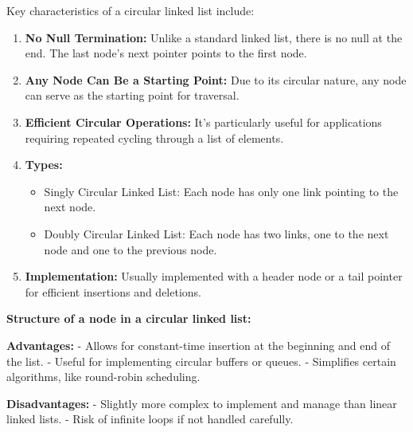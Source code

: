 Key characteristics of a circular linked list include:

\begin{enumerate}
\def\labelenumi{\arabic{enumi}.}
\item
  \textbf{No Null Termination:} Unlike a standard linked list, there is
  no null at the end. The last node's next pointer points to the first
  node.
\item
  \textbf{Any Node Can Be a Starting Point:} Due to its circular nature,
  any node can serve as the starting point for traversal.
\item
  \textbf{Efficient Circular Operations:} It's particularly useful for
  applications requiring repeated cycling through a list of elements.
\item
  \textbf{Types:}

  \begin{itemize}
  \tightlist
  \item
    Singly Circular Linked List: Each node has only one link pointing to
    the next node.
  \item
    Doubly Circular Linked List: Each node has two links, one to the
    next node and one to the previous node.
  \end{itemize}
\item
  \textbf{Implementation:} Usually implemented with a header node or a
  tail pointer for efficient insertions and deletions.
\end{enumerate}

\textbf{Structure of a node in a circular linked list:}

\begin{Shaded}
\begin{Highlighting}[]
     \NormalTok{(}
        \OperatorTok{=}
         \OperatorTok{=}   
\end{Highlighting}
\end{Shaded}

\textbf{Advantages:} - Allows for constant-time insertion at the
beginning and end of the list. - Useful for implementing circular
buffers or queues. - Simplifies certain algorithms, like round-robin
scheduling.

\textbf{Disadvantages:} - Slightly more complex to implement and manage
than linear linked lists. - Risk of infinite loops if not handled
carefully.

